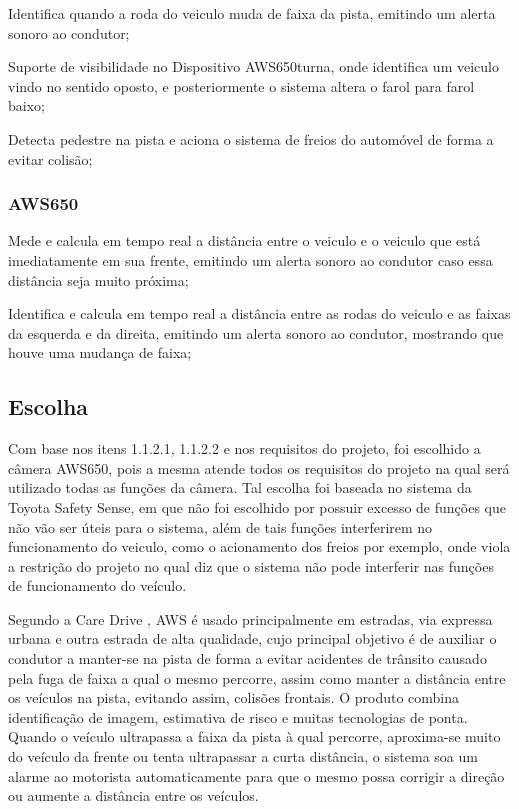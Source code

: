 Identifica quando a roda do veiculo muda de faixa da pista, emitindo um alerta sonoro ao condutor;

Suporte de visibilidade no Dispositivo AWS650turna, onde identifica um veiculo vindo no sentido oposto, e posteriormente o sistema altera o farol para farol baixo;

Detecta pedestre na pista e aciona o sistema de freios do automóvel de forma a evitar colisão;

\subsubsection{AWS650}
Mede e calcula em tempo real a distância entre o veiculo e o veiculo que está imediatamente em sua frente, emitindo um alerta sonoro ao condutor caso essa distância seja muito próxima;

Identifica e calcula em tempo real a distância entre as rodas do veiculo e as faixas da esquerda e da direita, emitindo um alerta sonoro ao condutor, mostrando que houve uma mudança de faixa;

\subsection{Escolha}

Com base nos itens 1.1.2.1, 1.1.2.2 e nos requisitos do projeto, foi escolhido a câmera AWS650, pois a mesma atende todos os requisitos do projeto na qual será utilizado todas as funções da câmera. Tal escolha foi baseada no sistema  da Toyota Safety Sense, em que não foi escolhido por possuir excesso de funções que não vão ser úteis para o sistema, além de tais funções interferirem no funcionamento do veiculo, como o acionamento dos freios  por exemplo,  onde viola a restrição do projeto no qual diz que o sistema não pode interferir nas funções de funcionamento do veículo.

Segundo a Care Drive \cite{care_drive}, AWS é usado principalmente em estradas, via expressa urbana e outra estrada de alta qualidade, cujo principal objetivo é de auxiliar o condutor a manter-se na pista de forma a evitar acidentes de trânsito causado pela fuga de faixa a qual o mesmo percorre, assim como manter a  distância entre os veículos na pista, evitando assim, colisões frontais. O produto combina identificação de imagem, estimativa de risco e muitas tecnologias de ponta. Quando o veículo ultrapassa a faixa da pista à qual percorre, aproxima-se muito do veículo da frente ou tenta ultrapassar a curta distância, o sistema soa um alarme ao motorista automaticamente para que o mesmo possa corrigir a direção ou aumente a distância entre os veículos.

